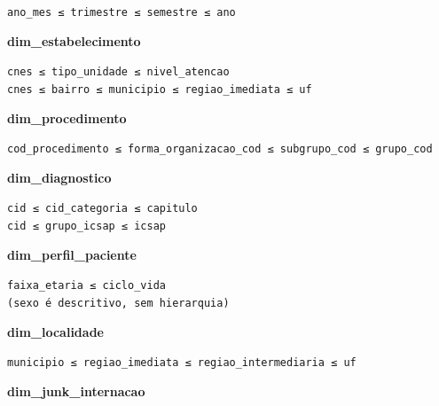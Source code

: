 \documentclass[12pt,a4paper]{article}
\newenvironment{hierarquias}{\par\nopagebreak\leftskip=20pt\small\setlength{\parskip}{0pt}}{\par\medskip}
\begin{document}
\begin{hierarquias}\texttt{ano\_\allowbreak{}mes ≤ trimestre ≤ semestre ≤ ano}\end{hierarquias}

\textbf{dim\_\allowbreak{}estabelecimento}\par\nopagebreak\smallskip

\begin{hierarquias}\texttt{cnes ≤ tipo\_\allowbreak{}unidade ≤ nivel\_\allowbreak{}atencao}\\\texttt{cnes ≤ bairro ≤ municipio ≤ regiao\_\allowbreak{}imediata ≤ uf}\end{hierarquias}

\textbf{dim\_\allowbreak{}procedimento}\par\nopagebreak\smallskip

\begin{hierarquias}\texttt{cod\_\allowbreak{}procedimento ≤ forma\_\allowbreak{}organizacao\_\allowbreak{}cod ≤ subgrupo\_\allowbreak{}cod ≤ grupo\_\allowbreak{}cod}\end{hierarquias}

\textbf{dim\_\allowbreak{}diagnostico}\par\nopagebreak\smallskip

\begin{hierarquias}\texttt{cid ≤ cid\_\allowbreak{}categoria ≤ capitulo}\\\texttt{cid ≤ grupo\_\allowbreak{}icsap ≤ icsap}\end{hierarquias}

\textbf{dim\_\allowbreak{}perfil\_\allowbreak{}paciente}\par\nopagebreak\smallskip

\begin{hierarquias}\texttt{faixa\_\allowbreak{}etaria ≤ ciclo\_\allowbreak{}vida}\\\texttt{(sexo é descritivo, sem hierarquia)}\end{hierarquias}

\textbf{dim\_\allowbreak{}localidade}\par\nopagebreak\smallskip

\begin{hierarquias}\texttt{municipio ≤ regiao\_\allowbreak{}imediata ≤ regiao\_\allowbreak{}intermediaria ≤ uf}\end{hierarquias}

\textbf{dim\_\allowbreak{}junk\_\allowbreak{}internacao}\par\nopagebreak\smallskip
\end{document}
